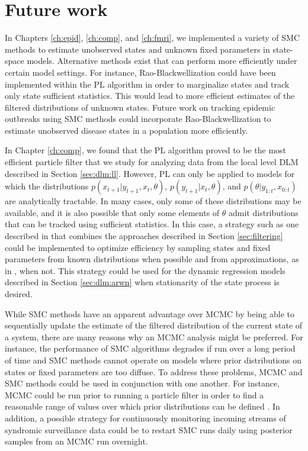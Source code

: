 \chapter{Future work \label{sec:future}}

In Chapters \ref{ch:epid}, \ref{ch:comp}, and \ref{ch:fmri}, we implemented a variety of SMC methods to estimate unobserved states and unknown fixed parameters in state-space models. Alternative methods exist that can perform more efficiently under certain model settings. For instance, Rao-Blackwellization \citep{Douc:Gods:Andr:on:2000} could have been implemented within the PL algorithm in order to marginalize states and track only state sufficient statistics. This would lead to more efficient estimates of the filtered distributions of unknown states. Future work on tracking epidemic outbreaks using SMC methods could incorporate Rao-Blackwellization to estimate unobserved disease states in a population more efficiently.

In Chapter \ref{ch:comp}, we found that the PL algorithm proved to be the most efficient particle filter that we study for analyzing data from the local level DLM described in Section \ref{sec:dlm:ll}. However, PL can only be applied to models for which the distributions $p(x_{t+1}|y_{t+1},x_t,\theta)$, $p(y_{t+1}|x_t,\theta)$, and $p(\theta|y_{1:t},x_{0:t})$ are analytically tractable. In many cases, only some of these distributions may be available, and it is also possible that only some elements of $\theta$ admit distributions that can be tracked using sufficient statistics. In this case, a strategy such as one described in \citet{dukic2012tracking} that combines the approaches described in Section \ref{sec:filtering} could be implemented to optimize efficiency by sampling states and fixed parameters from known distributions when possible and from approximations, as in \citet{Liu:West:comb:2001}, when not. This strategy could be used for the dynamic regression models described in Section \ref{sec:dlm:arwn} when stationarity of the state process is desired.

While SMC methods have an apparent advantage over MCMC by being able to sequentially update the estimate of the filtered distribution of the current state of a system, there are many reasons why an MCMC analysis might be preferred. For instance, the performance of SMC algorithms degrades if run over a long period of time and SMC methods cannot operate on models where prior distributions on states or fixed parameters are too diffuse. To address these problems, MCMC and SMC methods could be used in conjunction with one another. For instance, MCMC could be run prior to running a particle filter in order to find a reasonable range of values over which prior distributions can be defined \cite[Chapter 5][]{petris:camp:2009:dynamic}. In addition, a possible strategy for continuously monitoring incoming streams of syndromic surveillance data could be to restart SMC runs daily using posterior samples from an MCMC run overnight.

